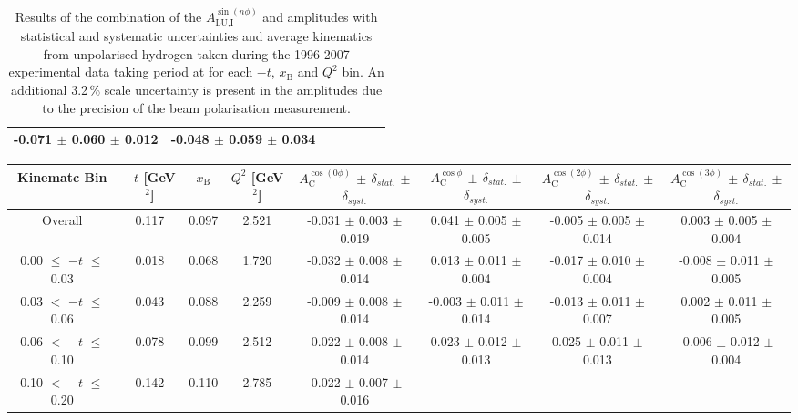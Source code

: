 {\begin{table}[width=15cm]
\begin{center}
{\begin{tabular}{|c|c|c|c|c|c|c|}
-0.071  $\pm$  0.060 $\pm$ 0.012 & -0.048  $\pm$  0.059  $\pm$  0.034\\
\hline
  \end{tabular}
}
 \end{center}
\caption{Results of the combination of the $A_{\textrm{LU,I}}^{\sin(n\phi)}$ and   amplitudes with statistical and systematic uncertainties and average kinematics from unpolarised hydrogen taken during
the 1996-2007 experimental data taking period at  for each $-t$, $x_{\textrm{B}}$ and $Q^{2}$ bin.
An additional 3.2\,\% scale uncertainty is present in the amplitudes due to the precision of
the beam polarisation measurement.
}
\end{table}


\begin{table}[width=15cm]
 \begin{center}
\resizebox{16cm}{!} {
  \begin{tabular}{|c|c|c|c|c|c|c|c|}
\hline
Kinematc Bin &  $-t$ [GeV$^{2}$] & $x_{\textrm{B}}$ & $Q^{2}$ [GeV$^{2}$] & 
$A_{\textrm{C}}^{\cos(0\phi)}$ $\pm$ $\delta_{stat.}$ $\pm$ $\delta_{syst.}$ & $A_{\textrm{C}}^{\cos\phi}$ $\pm$ $\delta_{stat.}$ $\pm$ $\delta_{syst.}$
& $A_{\textrm{C}}^{\cos(2\phi)}$ $\pm$ $\delta_{stat.}$ $\pm$ $\delta_{syst.}$ & $A_{\textrm{C}}^{\cos(3\phi)}$ $\pm$ $\delta_{stat.}$ $\pm$ $\delta_{syst.}$ \\
\hline
\hline
Overall &  0.117 & 0.097 &  2.521 &  -0.031 $\pm$  0.003 $\pm$  0.019 & 
0.041  $\pm$  0.005 $\pm$   0.005 &  -0.005  $\pm$  0.005  $\pm$   0.014 &  0.003  $\pm$   0.005   $\pm$   0.004 \\
\hline
0.00 $\leqslant$ $-t$ $\leqslant$ 0.03 &  0.018 & 0.068 &  1.720 &  -0.032  $\pm$  0.008 $\pm$ 0.014 & 
0.013  $\pm$  0.011  $\pm$   0.004 &  -0.017  $\pm$  0.010 $\pm$  0.004 &  -0.008   $\pm$  0.011   $\pm$   0.005\\
0.03 $<$ $-t$ $\leqslant$ 0.06 &  0.043 & 0.088 &  2.259& -0.009  $\pm$  0.008  $\pm$   0.014 &
 -0.003 $\pm$  0.011  $\pm$   0.014 &  -0.013  $\pm$  0.011  $\pm$  0.007 &  0.002   $\pm$  0.011   $\pm$   0.005\\
0.06 $<$ $-t$ $\leqslant$ 0.10 &  0.078 & 0.099 &  2.512 & -0.022  $\pm$  0.008  $\pm$  0.014 & 
0.023 $\pm$  0.012  $\pm$   0.013 & 0.025  $\pm$  0.011 $\pm$   0.013 &  -0.006   $\pm$  0.012  $\pm$    0.004\\
0.10 $<$ $-t$ $\leqslant$ 0.20 &  0.142 & 0.110 &  2.785 &  -0.022  $\pm$  0.007   $\pm$  0.016 & 

\end{tabular}}
\end{center}
\end{table}}
